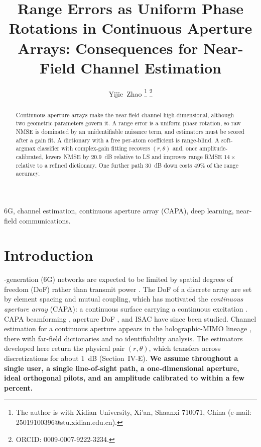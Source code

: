 \documentclass[journal]{IEEEtran}
\begin{document}
\title{Range Errors as Uniform Phase Rotations in Continuous Aperture Arrays: Consequences for Near-Field Channel Estimation}

\author{Yijie~Zhao%
\thanks{The author is with Xidian University, Xi'an, Shaanxi 710071, China (e-mail: 25019100396@stu.xidian.edu.cn).}%
\thanks{ORCID: 0009-0007-9222-3234.}%
}

\maketitle

\begin{abstract}
Continuous aperture arrays make the near-field channel high-dimensional, although two geometric parameters govern it. A range error is a uniform phase rotation, so raw NMSE is dominated by an unidentifiable nuisance term, and estimators must be scored after a gain fit. A dictionary with a free per-atom coefficient is range-blind. A soft-argmax classifier with complex-gain fitting recovers $(r,\theta)$ and, once amplitude-calibrated, lowers NMSE by $20.9$~dB relative to LS and improves range RMSE $14\times$ relative to a refined dictionary. One further path $30$~dB down costs $49\%$ of the range accuracy.
\end{abstract}

\begin{IEEEkeywords}
6G, channel estimation, continuous aperture array (CAPA), deep learning, near-field communications.
\end{IEEEkeywords}

\section{Introduction}
-generation (6G) networks are expected to be limited by spatial degrees of freedom (DoF) rather than transmit power \cite{foschini}. The DoF of a discrete array are set by element spacing and mutual coupling, which has motivated the \emph{continuous aperture array} (CAPA): a continuous surface carrying a continuous excitation \cite{capa2024,holographic}. CAPA beamforming \cite{capaMIMO,capaOptimal}, aperture DoF \cite{capaDoF,capaOrientation,dofHolo,dofNF}, and ISAC \cite{capaISAC} have since been studied. Channel estimation for a continuous aperture appears in the holographic-MIMO lineage \cite{hmimoDFT,hmimoAngle}, there with far-field dictionaries and no identifiability analysis. The estimators developed here return the physical pair $(r,\theta)$, which transfers across discretizations for about $1$~dB (Section~IV-E). \textbf{We assume throughout a single user, a single line-of-sight path, a one-dimensional aperture, ideal orthogonal pilots, and an amplitude calibrated to within a few percent.}
\end{document}
